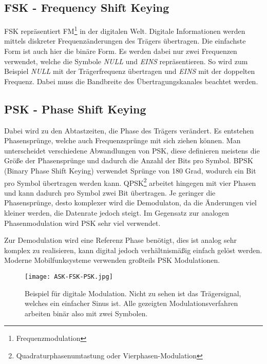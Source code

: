 \subsection{FSK - Frequency Shift Keying}
FSK repräsentiert FM\footnote{Frequenzmodulation} in der digitalen Welt. Digitale Informationen werden mittels diskreter Frequenzänderungen des Trägers übertragen. Die einfachste Form ist auch hier die binäre Form. Es werden dabei nur zwei Frequenzen verwendet, welche die Symbole \emph{NULL} und \emph{EINS} repräsentieren. So wird zum Beispiel \emph{NULL} mit der Trägerfrequenz übertragen und \emph{EINS} mit der doppelten Frequenz. Dabei muss die Bandbreite des Übertragungskanales beachtet werden. 

\subsection{PSK - Phase Shift Keying}
Dabei wird zu den Abtastzeiten, die Phase des Trägers verändert. Es entstehen Phasensprünge, welche auch Frequenzsprünge mit sich ziehen können. Man unterscheidet verschiedene Abwandlungen von PSK, diese definieren meistens die Größe der Phasensprünge und dadurch die Anzahl der Bits pro Symbol. BPSK (Binary Phase Shift Keying) verwendet Sprünge von 180 Grad, wodurch ein Bit pro Symbol übertragen werden kann. QPSK\footnote{Quadraturphasenumtastung oder Vierphasen-Modulation} arbeitet hingegen mit vier Phasen und kann dadurch pro Symbol zwei Bit übertragen. Je geringer die Phasensprünge, desto komplexer wird die Demodulaton, da die Änderungen viel kleiner werden, die Datenrate jedoch steigt. Im Gegensatz zur analogen Phasenmodulation wird PSK sehr viel verwendet.

Zur Demodulation wird eine Referenz Phase benötigt, dies ist analog sehr komplex zu realisieren, kann digital jedoch verhältnismäßig einfach gelöst werden. Moderne Mobilfunksysteme verwenden großteils PSK Modulationen.

\begin{figure}[H]
\centering
\texttt{[image: ASK-FSK-PSK.jpg]}
\caption{ Beispiel für digitale Modulation.
Nicht zu sehen ist das Trägersignal, welches ein einfacher Sinus ist.
Alle gezeigten Modulationsverfahren arbeiten binär also mit zwei Symbolen.}
\label{fig:DigitalModulation}
\end{figure}
